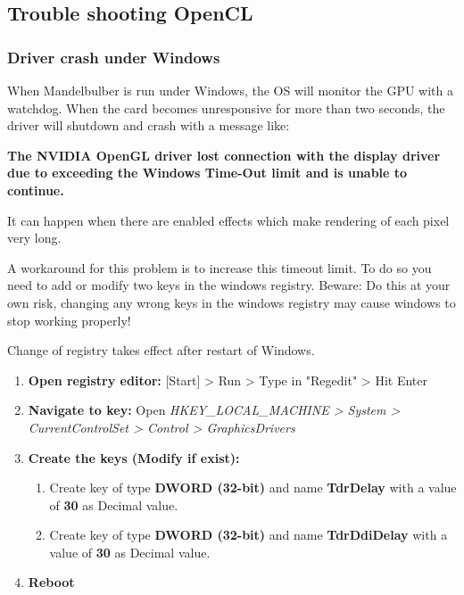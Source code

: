 \subsection{Trouble shooting OpenCL}\label{opencl-troubleshooting}

\subsubsection{Driver crash under Windows}

When Mandelbulber is run under Windows, the OS will monitor the GPU with a watchdog. When the card becomes unresponsive for more than two seconds, the driver will shutdown and crash with a message like:

\textbf{The NVIDIA OpenGL driver lost connection with the display driver due to exceeding the Windows Time-Out limit and is unable to continue.}

It can happen when there are enabled effects which make rendering of each pixel very long. 

A workaround for this problem is to increase this timeout limit. To do so you need to add or modify two keys in the windows registry. Beware: Do this at your own risk, changing any wrong keys in the windows registry may cause windows to stop working properly!

Change of registry takes effect after restart of Windows.

\begin{enumerate}
	
	\item \textbf{Open registry editor:} [Start] > Run > Type in "Regedit" > Hit Enter
	\item \textbf{Navigate to key:} Open \emph{HKEY\_LOCAL\_MACHINE > System > CurrentControlSet > Control > GraphicsDrivers}
	\item \textbf{Create the keys (Modify if exist):}
	\begin{enumerate}
		\item Create key of type \textbf{DWORD (32-bit)} and name \textbf{TdrDelay} with a value of \textbf{30} as Decimal value.
		\item Create key of type \textbf{DWORD (32-bit)} and name \textbf{TdrDdiDelay} with a value of \textbf{30} as Decimal value.	
	\end{enumerate}	
	\item \textbf{Reboot}

\end{enumerate}

